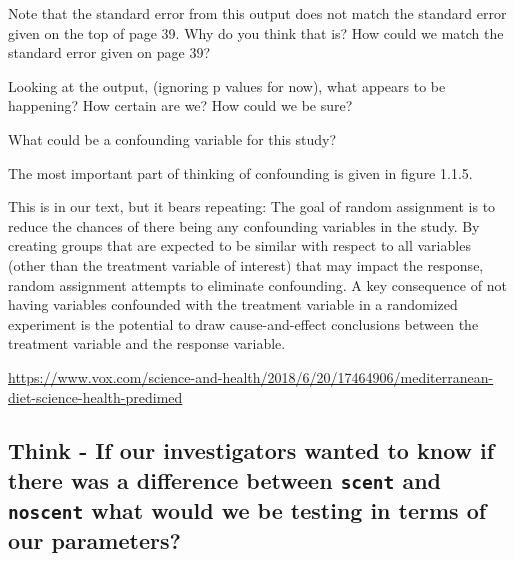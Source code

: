 \documentclass[
]{article}
\begin{document}
Note that the standard error from this output does not match the
standard error given on the top of page 39. Why do you think that is?
How could we match the standard error given on page 39?

\vspace{1.5in}

Looking at the output, (ignoring p values for now), what appears to be
happening? How certain are we? How could we be sure?

\vspace{.5in}

What could be a confounding variable for this study?

\vspace{.5in}

The most important part of thinking of confounding is given in figure
1.1.5.

\vspace{.5in}

This is in our text, but it bears repeating: The goal of random
assignment is to reduce the chances of there being any confounding
variables in the study. By creating groups that are expected to be
similar with respect to all variables (other than the treatment variable
of interest) that may impact the response, random assignment attempts to
eliminate confounding. A key consequence of not having variables
confounded with the treatment variable in a randomized experiment is the
potential to draw cause-and-effect conclusions between the treatment
variable and the response variable.

\url{https://www.vox.com/science-and-health/2018/6/20/17464906/mediterranean-diet-science-health-predimed}

\hypertarget{think---if-our-investigators-wanted-to-know-if-there-was-a-difference-between-scent-and-noscent-what-would-we-be-testing-in-terms-of-our-parameters}{%
\subsection{\texorpdfstring{Think - If our investigators wanted to know
if there was a difference between \texttt{scent} and \texttt{noscent}
what would we be testing in terms of our
parameters?}{Think - If our investigators wanted to know if there was a difference between scent and noscent what would we be testing in terms of our parameters?}}\label{think---if-our-investigators-wanted-to-know-if-there-was-a-difference-between-scent-and-noscent-what-would-we-be-testing-in-terms-of-our-parameters}}
\end{document}
